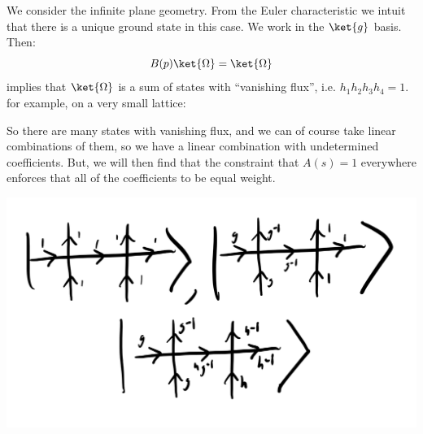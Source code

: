 We consider the infinite plane geometry. From the Euler characteristic we intuit that there is a unique ground state in this case. We work in the $\ket{g}$ basis. Then:
\begin{equation}
    B(p)\ket{\Omega} = \ket{\Omega}
\end{equation}
implies that $\ket{\Omega}$ is a sum of states with ``vanishing flux'', i.e. $h_1h_2h_3h_4 = 1$. for example, on a very small lattice:

So there are many states with vanishing flux, and we can of course take linear combinations of them, so we have a linear combination with undetermined coefficients. But, we will then find that the constraint that $A(s) = 1$ everywhere enforces that all of the coefficients to be equal weight.

\begin{center}
    \includegraphics[scale=0.35]{Lectures/Images/lec7-nofluxstates.png}
\end{center}